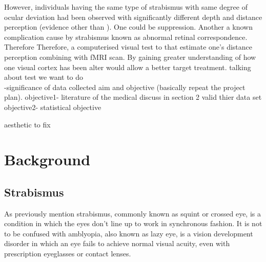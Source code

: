 \documentclass[12pt]{article}
\begin{document}

However, individuals having the same type of strabismus with same degree of ocular deviation had been observed with significantly different depth and distance perception (evidence other than \citep{Hussain2018}). One could be suppression. Another a known complication cause by strabismus known as abnormal retinal correspondence. Therefore 
Therefore, a computerised visual test \citep{Hussain2018} to that estimate one's distance perception combining with fMRI scan. By gaining greater understanding of how one visual cortex has been alter would allow a better target treatment.
talking about test we want to do\\
-significance of data collected
aim and objective (basically repeat the project plan).
objective1- literature of the medical discuss in section 2
valid thier data set
objective2- statistical 
objective

aesthetic to fix

\newpage
\section{Background}
    \subsection{Strabismus}
        As previously mention strabismus, commonly known as squint or crossed eye, is a condition in which the eyes don’t line up to work in synchronous fashion. It is not to be confused with amblyopia, also known as lazy eye, is a vision development disorder in which an eye fails to achieve normal visual acuity, even with prescription eyeglasses or contact lenses.\\
        
\end{document}

